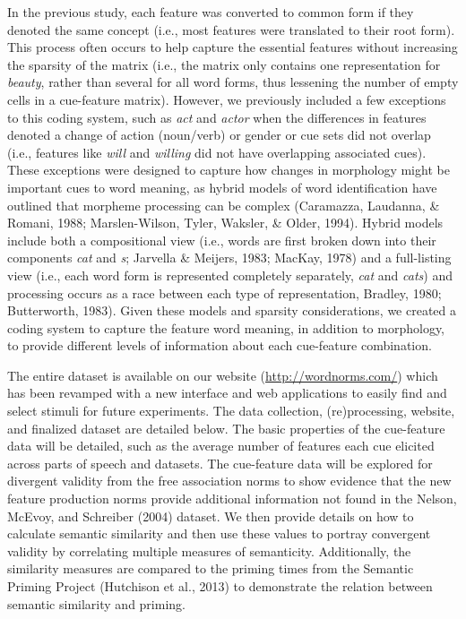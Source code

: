 \documentclass[english,,man]{apa6}
\theoremstyle{definition}
\theoremstyle{definition}
\theoremstyle{definition}
\theoremstyle{remark}
\begin{document}
In the previous study, each feature was converted to common form if they
denoted the same concept (i.e., most features were translated to their
root form). This process often occurs to help capture the essential
features without increasing the sparsity of the matrix (i.e., the matrix
only contains one representation for \emph{beauty}, rather than several
for all word forms, thus lessening the number of empty cells in a
cue-feature matrix). However, we previously included a few exceptions to
this coding system, such as \emph{act} and \emph{actor} when the
differences in features denoted a change of action (noun/verb) or gender
or cue sets did not overlap (i.e., features like \emph{will} and
\emph{willing} did not have overlapping associated cues). These
exceptions were designed to capture how changes in morphology might be
important cues to word meaning, as hybrid models of word identification
have outlined that morpheme processing can be complex (Caramazza,
Laudanna, \& Romani, 1988; Marslen-Wilson, Tyler, Waksler, \& Older,
1994). Hybrid models include both a compositional view (i.e., words are
first broken down into their components \emph{cat} and \emph{s};
Jarvella \& Meijers, 1983; MacKay, 1978) and a full-listing view (i.e.,
each word form is represented completely separately, \emph{cat} and
\emph{cats}) and processing occurs as a race between each type of
representation, Bradley, 1980; Butterworth, 1983). Given these models
and sparsity considerations, we created a coding system to capture the
feature word meaning, in addition to morphology, to provide different
levels of information about each cue-feature combination.

The entire dataset is available on our website
(\url{http://wordnorms.com/}) which has been revamped with a new
interface and web applications to easily find and select stimuli for
future experiments. The data collection, (re)processing, website, and
finalized dataset are detailed below. The basic properties of the
cue-feature data will be detailed, such as the average number of
features each cue elicited across parts of speech and datasets. The
cue-feature data will be explored for divergent validity from the free
association norms to show evidence that the new feature production norms
provide additional information not found in the Nelson, McEvoy, and
Schreiber (2004) dataset. We then provide details on how to calculate
semantic similarity and then use these values to portray convergent
validity by correlating multiple measures of semanticity. Additionally,
the similarity measures are compared to the priming times from the
Semantic Priming Project (Hutchison et al., 2013) to demonstrate the
relation between semantic similarity and priming.
\end{document}
